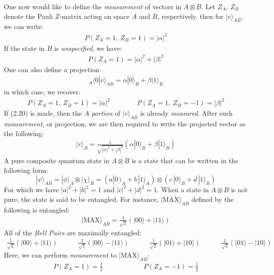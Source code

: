 \documentclass[11pt]{book}
\theoremstyle{break}
\theoremstyle{break}
\begin{document}
One now would like to define the \textit{measurement} of vectors in $A\otimes B$. Let $Z_A$, $Z_B$ denote the Pauli $Z$-matrix acting on space $A$ and $B$, respectively, then for $|v\rangle_{AB}$, we can write:
\begin{align*}
P(Z_A = 1 ,\ Z_B = 1) = |\alpha|^2
\end{align*}
If the state in $B$ is \textit{unspecified}, we have:
\begin{align*}
P(Z_A = 1) = |\alpha|^2 + |\beta|^2
\end{align*}
One can also define a projection:
\begin{align}
_A\langle 0 |v\rangle_{AB} = \alpha |0\rangle_B + \beta |1\rangle_B
\end{align}
in which case, we recover:
\begin{align*}
P(Z_A = 1,\ Z_B = 1) = |\alpha|^2 \qquad\qquad P(Z_A = 1,\ Z_B = -1) = |\beta|^2 
\end{align*}
If (2.20) is made, then the $A$ \textit{portion} of $|v\rangle_{AB}$ is already \textit{measured}. After such \textit{measurement}, or projection, we are then required to write the projected vector as the following:
\begin{align*}
|v\rangle_{B} = \frac{1}{\sqrt{|\alpha|^2 + |\beta|^2}}\left( \alpha |0\rangle_B + \beta |1\rangle_B\right)
\end{align*}
A pure composite quantum state in $A\otimes B$ is a state that can be written in the following form: 
$$|\psi\rangle_{AB} = |\phi\rangle_A \otimes |\chi\rangle_B = \left( a |0\,\rangle_A + b\,|1\rangle_A\right) \otimes \left( c\,|0\rangle_B + d\,|1\rangle_B \right)$$
For which we have $|a|^2 + |b|^2 =1$ and $|c|^2 + |d|^2 =1$. When a state in $A\otimes B$ is not pure, the state is said to be entangled. For instance, $|\text{MAX}\rangle_{AB}$ defined by the following is entangled:
\begin{align*}
|\text{MAX}\rangle_{AB} = \frac{1}{\sqrt{2}}\left( |00\rangle + |11\rangle\right)
\end{align*}
All of the \textit{Bell Pairs} are maximally entangled:
\begin{align*}
\frac{1}{\sqrt{2}}\left( |00\rangle + |11\rangle\right) \quad\qquad
\frac{1}{\sqrt{2}}\left( |00\rangle - |11\rangle\right) \quad\qquad
\frac{1}{\sqrt{2}}\left( |01\rangle + |10\rangle\right) \quad\qquad 
\frac{1}{\sqrt{2}}\left( |01\rangle - |10\rangle\right)
\end{align*}
Here, we can perform \textit{measurement} to $|\text{MAX}\rangle_{AB}$:
\begin{align}
P(Z_A=1) = \frac{1}{2} \qquad\qquad\qquad P(Z_A=-1) = \frac{1}{2}
\end{align}
\end{document}
